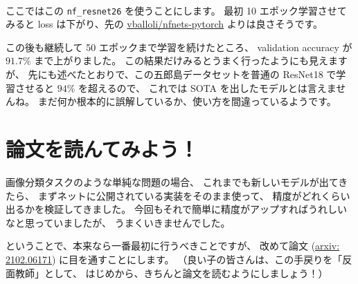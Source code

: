 \documentclass[dvipdfmx,autodetect-engine,10pt,b5paper,papersize,openany,dvipsnames]{jsbook}
\begin{document}
\begin{multicols}{2}
\vspace{8.0cm}

ここではこの \texttt{nf\_resnet26} を使うことにします。
最初 10 エポック学習させてみると loss は下がり、先の
\href{https://github.com/vballoli/nfnets-pytorch}{vballoli/nfnets-pytorch}
よりは良さそうです。


\vspace{4.5cm}

この後も継続して 50 エポックまで学習を続けたところ、
validation accuracy が $91.7\%$ まで上がりました。
この結果だけみるとうまく行ったようにも見えますが、
先にも述べたとおりで、この五郎島データセットを普通の ResNet18 で学習させると
$94\%$ を超えるので、
これでは SOTA を出したモデルとは言えませんね。
まだ何か根本的に誤解しているか、使い方を間違っているようです。


\section{論文を読んてみよう！}
画像分類タスクのような単純な問題の場合、
これまでも新しいモデルが出てきたら、
まずネットに公開されている実装をそのまま使って、
精度がどれくらい出るかを検証してきました。
今回もそれで簡単に精度がアップすればうれしいなと思っていましたが、
うまくいきませんでした。

ということで、本来なら一番最初に行うべきことですが、
改めて論文 (\href{https://arxiv.org/abs/2102.06171}{arxiv: 2102.06171})
に目を通すことにします。
（良い子の皆さんは、この手戻りを「反面教師」として、
はじめから、きちんと論文を読むようにしましょう！）


\end{multicols}
\end{document}

